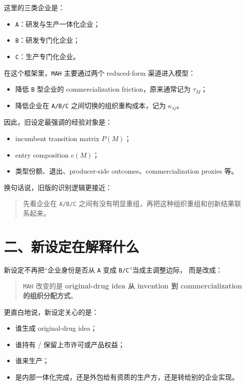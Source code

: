 \documentclass[12pt,fontset=none]{ctexart}
\begin{document}
这里的三类企业是：

\begin{itemize}[leftmargin=2em]
    \item \texttt{A}：研发与生产一体化企业；
    \item \texttt{B}：研发专门化企业；
    \item \texttt{C}：生产专门化企业。
\end{itemize}

在这个框架里，\texttt{MAH} 主要通过两个 reduced-form 渠道进入模型：

\begin{itemize}[leftmargin=2em]
    \item 降低 \texttt{B} 型企业的 commercialization friction，原来通常记为
    \(\tau_M\)；
    \item 降低企业在 \texttt{A/B/C} 之间切换的组织重构成本，记为
    \(\kappa_{sj}\)。
\end{itemize}

因此，旧设定最强调的经验对象是：

\begin{itemize}[leftmargin=2em]
    \item incumbent transition matrix \(P(M)\)；
    \item entry composition \(e(M)\)；
    \item 类型份额、退出、producer-side outcomes、commercialization proxies 等。
\end{itemize}

换句话说，旧版的识别逻辑更接近：

\begin{quote}
先看企业在 \texttt{A/B/C} 之间有没有明显重组，再把这种组织重组和创新结果联系起来。
\end{quote}

\section{二、新设定在解释什么}

新设定不再把“企业身份是否从 \texttt{A} 变成 \texttt{B/C}”当成主调整边际，
而是改成：

\begin{quote}
\texttt{MAH} 改变的是
\textbf{original-drug idea 从 invention 到 commercialization 的组织分配方式}。
\end{quote}

更直白地说，新设定关心的是：

\begin{itemize}[leftmargin=2em]
    \item 谁生成 original-drug idea；
    \item 谁持有 / 保留上市许可或产品权益；
    \item 谁来生产；
    \item 是内部一体化完成，还是外包给有资质的生产方，还是转给别的企业实现。
\end{itemize}
\end{document}
